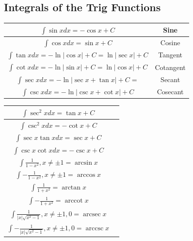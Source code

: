 \documentclass{article}
\DeclareMathOperator{\arcsec}{arcsec}
\DeclareMathOperator{\arccot}{arccot}
\DeclareMathOperator{\arccsc}{arccsc}
\begin{document}
        \subsection{Integrals of the Trig Functions}
            \begin{center}
                \begin{tabular} {|c|c|}
                    \hline
                    $\int \sin{x} dx = -\cos{x}+C$ & Sine \\
                    \hline
                    $\int \cos{x} dx = \sin{x}+C$ & Cosine \\
                    \hline
                    $\int \tan{x} dx = -\ln{|\cos{x}|}+C=\ln{|\sec{x}|}+C$ & Tangent \\
                    \hline
                    $\int \cot{x} dx = -\ln{|\sin{x}|}+C = \ln{|\cos{x}|}+C$ & Cotangent \\
                    \hline
                    $\int \sec{x} dx = -\ln{|\sec{x}+\tan{x}|}+C=$ & Secant \\
                    \hline
                    $\int \csc{x} dx = -\ln{|\csc{x}+\cot{x}|}+C$ & Cosecant \\
                    \hline
                \end{tabular}
            \end{center}
            \begin{center}
                \begin{tabular}{|c|c|}
                    \hline
                    $\int \sec^2{x}dx = \tan{x}+C$ & \\
                    \hline
                    $\int \csc^2{x}dx = -\cot{x}+C$ & \\
                    \hline
                    $\int \sec{x}\tan{x}dx = \sec{x}+C$ & \\
                    \hline
                    $\int \csc{x}\cot{x}dx = -\csc{x}+C$ & \\
                    \hline
                    $\int \frac{1}{1-x^2}, x\not =\pm 1 = \arcsin{x}$ & \\
                    \hline
                    $\int -\frac{1}{1-x^2}, x\not =\pm 1 = \arccos{x}$ & \\
                    \hline
                    $\int \frac{1}{1+x^2}=\arctan{x}$ & \\
                    \hline
                    $\int -\frac{1}{1+x^2}=\arccot{x}$ & \\
                    \hline
                    $\int \frac{1}{|x|\sqrt{x^2-1}}, x\not = \pm 1,0=\arcsec{x}$ & \\
                    \hline
                    $\int -\frac{1}{|x|\sqrt{x^2-1}}, x\not = \pm 1,0=\arccsc{x}$ & \\
                    \hline
                \end{tabular}
            \end{center}
\end{document}
